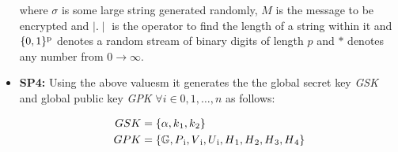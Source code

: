 \documentclass[conference]{IEEEtran}
\begin{document}
\begin{itemize}
where $\sigma$ is some large string generated randomly, $M$ is the message to be encrypted and $\mid . \mid$ is the operator to find the length of a string within it and $\{0,1\}\textsuperscript{p}$ denotes a random stream of binary digits of length $p$ and $*$ denotes any number from $0 \longrightarrow \infty $.
\item{\textbf{SP4:}} Using the above valuesm it generates the the global secret key \emph{GSK} and global public key \emph{GPK} $ \forall i \in 0,1,\ldots , n$ as follows:
\begin{ceqn}
\begin{align}
GSK &= \{ \alpha, k\textsubscript{1},k\textsubscript{2}\}\\
GPK &= \{ \mathbb{G}, P\textsubscript{i}, V\textsubscript{i}, U\textsubscript{i}, H\textsubscript{1}, H\textsubscript{2}, H\textsubscript{3}, H\textsubscript{4} \}
\end{align}
\end{ceqn}
\end{itemize}
\end{document}
